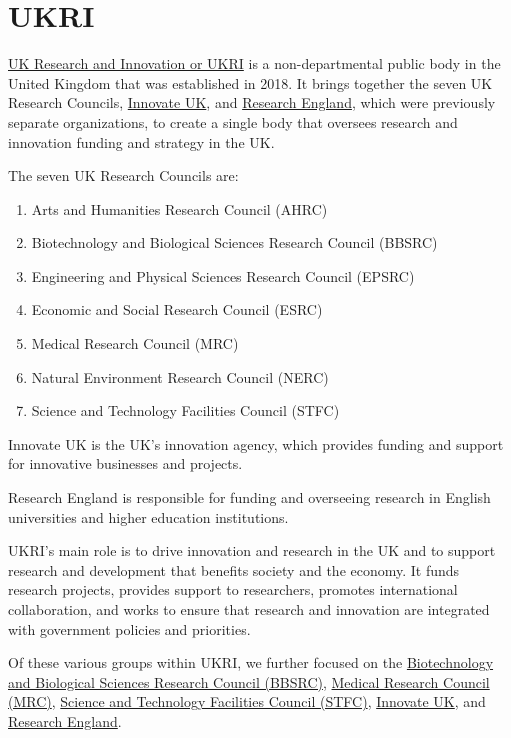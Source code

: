 \documentclass[
]{book}
\providecommand{\tightlist}{%
  \setlength{\itemsep}{0pt}\setlength{\parskip}{0pt}}
\begin{document}
\hypertarget{ukri}{%
\section{UKRI}\label{ukri}}

\href{https://www.ukri.org/}{UK Research and Innovation or UKRI} is a non-departmental public body in the United Kingdom that was established in 2018. It brings together the seven UK Research Councils, \href{https://www.ukri.org/councils/innovate-uk/}{Innovate UK}, and \href{https://www.ukri.org/councils/research-england/}{Research England}, which were previously separate organizations, to create a single body that oversees research and innovation funding and strategy in the UK.

The seven UK Research Councils are:

\begin{enumerate}
\def\labelenumi{\arabic{enumi}.}
\tightlist
\item
  Arts and Humanities Research Council (AHRC)
\item
  Biotechnology and Biological Sciences Research Council (BBSRC)
\item
  Engineering and Physical Sciences Research Council (EPSRC)
\item
  Economic and Social Research Council (ESRC)
\item
  Medical Research Council (MRC)
\item
  Natural Environment Research Council (NERC)
\item
  Science and Technology Facilities Council (STFC)
\end{enumerate}

Innovate UK is the UK's innovation agency, which provides funding and support for innovative businesses and projects.

Research England is responsible for funding and overseeing research in English universities and higher education institutions.

UKRI's main role is to drive innovation and research in the UK and to support research and development that benefits society and the economy. It funds research projects, provides support to researchers, promotes international collaboration, and works to ensure that research and innovation are integrated with government policies and priorities.

Of these various groups within UKRI, we further focused on the \href{https://www.ukri.org/councils/bbsrc/}{Biotechnology and Biological Sciences Research Council (BBSRC)}, \href{https://www.ukri.org/councils/mrc/}{Medical Research Council (MRC)}, \href{https://www.ukri.org/councils/stfc/}{Science and Technology Facilities Council (STFC)}, \href{https://www.ukri.org/councils/innovate-uk/}{Innovate UK}, and \href{https://www.ukri.org/councils/research-england/}{Research England}.
\end{document}
